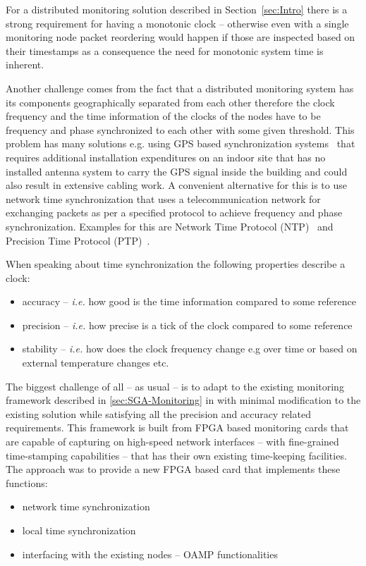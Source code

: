 \documentclass[article]{IEEEtran}
\begin{document}

For a distributed monitoring solution described in Section~\ref{sec:Intro} there is a strong requirement for having
a monotonic clock -- otherwise even with a single monitoring node packet reordering would happen if those are inspected
based on their timestamps as a consequence the need for monotonic system time is inherent. 

Another challenge comes from the fact that a distributed monitoring system has its components geographically
separated from each other therefore the clock frequency and the time information of the clocks of the nodes have to be 
frequency and phase synchronized to each other with some given threshold. This problem has many solutions e.g. using GPS based synchronization 
systems~\cite{GPS-CLOCK} that requires additional installation expenditures on an indoor site that has no installed 
antenna system to carry the GPS signal inside the building and could also result in extensive cabling work. 
A convenient alternative for this is to use network time synchronization that uses a telecommunication network for
exchanging packets as per a specified protocol to achieve frequency and phase synchronization. Examples for this
are Network Time Protocol (NTP)~\cite{NTP} and Precision Time Protocol (PTP)~\cite{PTP}.

When speaking about time synchronization the following properties describe a clock:
\begin{itemize}
	\item accuracy -- \emph{i.e.} how good is the time information compared to some reference
	\item precision -- \emph{i.e.} how precise is a tick of the clock compared to some reference
	\item stability -- \emph{i.e.} how does the clock frequency change  e.g over time or based on external temperature changes etc.
\end{itemize} 

The biggest challenge of all -- as usual -- is to adapt to the existing monitoring framework described in \ref{sec:SGA-Monitoring} 
in with minimal modification to the existing solution while satisfying all the precision and accuracy related requirements. 
This framework is built from FPGA based monitoring cards that are capable of capturing on high-speed network interfaces --
with fine-grained time-stamping capabilities -- that has their own existing time-keeping facilities. 
The approach was to provide a new FPGA based card that implements these functions:
\begin{itemize}
	\item network time synchronization
	\item local time synchronization
	\item interfacing with the existing nodes -- OAMP functionalities
\end{itemize}
\end{document}
